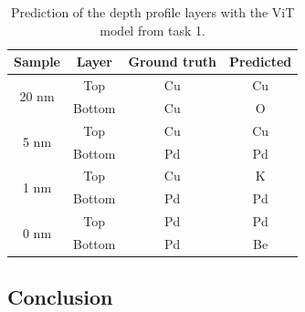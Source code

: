 \begin{table}[H]
    \centering
    \begin{tabular}{c|c|c|c}
        Sample & Layer    & Ground truth & Predicted     \\
                 \hline
\multirow{2}{3em}{20 nm}             &  Top    &       Cu      &       Cu               \\
                                      &  Bottom&        Cu      &       O        \\
                             \hline
\multirow{2}{3em}{5 nm}               &  Top    &       Cu      &       Cu               \\
                                       &  Bottom&        Pd      &       Pd  \\
                             \hline
\multirow{2}{3em}{1 nm}                &  Top    &       Cu      &   K               \\
                                       &  Bottom&        Pd      &   Pd  \\
                             \hline
\multirow{2}{3em}{0 nm}                &  Top    &       Pd      &    Pd               \\
                                       &  Bottom&        Pd      &    Be  \\
    \end{tabular}
    \caption{Prediction of the depth profile layers with the ViT model from task 1.}
    \label{tab:layers_depth}
\end{table}

\subsection{Conclusion}
